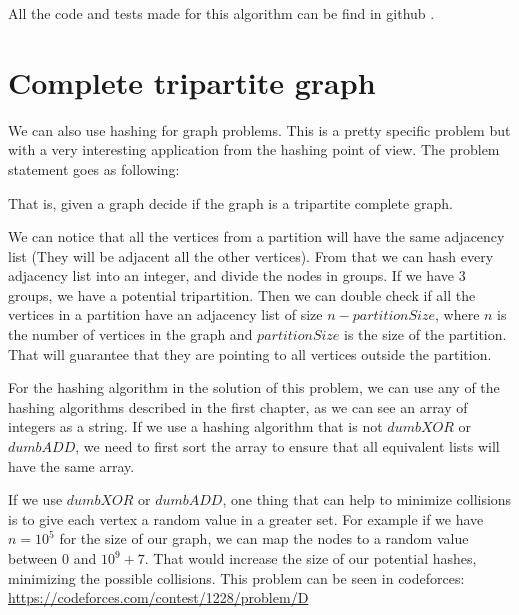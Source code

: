 All the code and tests made for this algorithm can be find in github \citep{GithubRepo}.

\section{Complete tripartite graph}

We can also use hashing for graph problems. This is a pretty specific problem but with a very interesting application from the hashing point of view. The problem statement goes as following:

\medskip


That is, given a graph decide if the graph is a tripartite complete graph. 

We can notice that all the vertices from a partition will have the same adjacency list (They will be adjacent all the other vertices). From that we can hash every adjacency list into an integer, and divide the nodes in groups. If we have 3 groups, we have a potential tripartition. Then we can double check if all the vertices in a partition have an adjacency list of size \( n - partitionSize \), where \( n \) is the number of vertices in the graph and \( partitionSize \) is the size of the partition. That will guarantee that they are pointing to all vertices outside the partition.

For the hashing algorithm in the solution of this problem, we can use any of the hashing algorithms described in the first chapter, as we can see an array of integers as a string. If we use a hashing algorithm that is not \( dumbXOR \) or \( dumbADD \), we need to first sort the array to ensure that all equivalent lists will have the same array.

If we use \( dumbXOR \) or \( dumbADD \), one thing that can help to minimize collisions is to give each vertex a random value in a greater set. For example if we have \( n = 10^5 \) for the size of our graph, we can map the nodes to a random value between \( 0 \) and \( 10^9 + 7 \). That would increase the size of our potential hashes, minimizing the possible collisions. This problem can be seen in codeforces: \url{https://codeforces.com/contest/1228/problem/D}

\medskip


